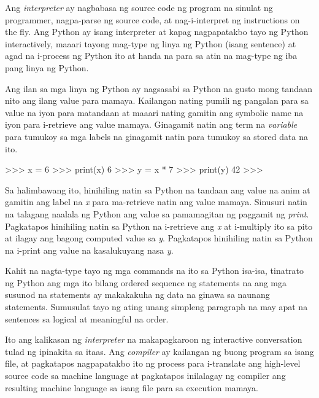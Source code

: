 \documentclass[10pt,]{book}
\newenvironment{Shaded}{}{}
\newcommand{\BuiltInTok}[1]{\textcolor[rgb]{0.00,0.50,0.00}{#1}}
\newcommand{\DecValTok}[1]{\textcolor[rgb]{0.25,0.63,0.44}{#1}}
\newcommand{\NormalTok}[1]{#1}
\newcommand{\OperatorTok}[1]{\textcolor[rgb]{0.40,0.40,0.40}{#1}}
\begin{document}
Ang \emph{interpreter} ay nagbabasa ng source code ng program na sinulat
ng programmer, nagpa-parse ng source code, at nag-i-interpret ng
instructions on the fly. Ang Python ay isang interpreter at kapag
nagpapatakbo tayo ng Python interactively, maaari tayong mag-type ng
linya ng Python (isang sentence) at agad na i-process ng Python ito at
handa na para sa atin na mag-type ng iba pang linya ng Python.

Ang ilan sa mga linya ng Python ay nagsasabi sa Python na gusto mong
tandaan nito ang ilang value para mamaya. Kailangan nating pumili ng
pangalan para sa value na iyon para matandaan at maaari nating gamitin
ang symbolic name na iyon para i-retrieve ang value mamaya. Ginagamit
natin ang term na \emph{variable} para tumukoy sa mga labels na
ginagamit natin para tumukoy sa stored data na ito.

\begin{Shaded}
\begin{Highlighting}[]
\OperatorTok{\textgreater{}\textgreater{}\textgreater{}}\NormalTok{ x }\OperatorTok{=} \DecValTok{6}
\OperatorTok{\textgreater{}\textgreater{}\textgreater{}} \BuiltInTok{print}\NormalTok{(x)}
\DecValTok{6}
\OperatorTok{\textgreater{}\textgreater{}\textgreater{}}\NormalTok{ y }\OperatorTok{=}\NormalTok{ x }\OperatorTok{*} \DecValTok{7}
\OperatorTok{\textgreater{}\textgreater{}\textgreater{}} \BuiltInTok{print}\NormalTok{(y)}
\DecValTok{42}
\OperatorTok{\textgreater{}\textgreater{}\textgreater{}}
\end{Highlighting}
\end{Shaded}

Sa halimbawang ito, hinihiling natin sa Python na tandaan ang value na
anim at gamitin ang label na \emph{x} para ma-retrieve natin ang value
mamaya. Sinusuri natin na talagang naalala ng Python ang value sa
pamamagitan ng paggamit ng \emph{print}. Pagkatapos hinihiling natin sa
Python na i-retrieve ang \emph{x} at i-multiply ito sa pito at ilagay
ang bagong computed value sa \emph{y}. Pagkatapos hinihiling natin sa
Python na i-print ang value na kasalukuyang nasa \emph{y}.

Kahit na nagta-type tayo ng mga commands na ito sa Python isa-isa,
tinatrato ng Python ang mga ito bilang ordered sequence ng statements na
ang mga susunod na statements ay makakakuha ng data na ginawa sa naunang
statements. Sumusulat tayo ng ating unang simpleng paragraph na may apat
na sentences sa logical at meaningful na order.

Ito ang kalikasan ng \emph{interpreter} na makapagkaroon ng interactive
conversation tulad ng ipinakita sa itaas. Ang \emph{compiler} ay
kailangan ng buong program sa isang file, at pagkatapos nagpapatakbo ito
ng process para i-translate ang high-level source code sa machine
language at pagkatapos inilalagay ng compiler ang resulting machine
language sa isang file para sa execution mamaya.
\end{document}
